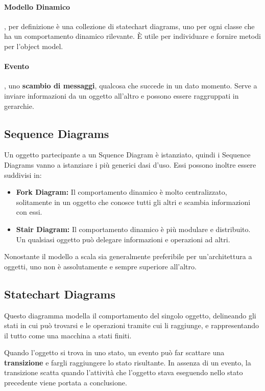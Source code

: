     \paragraph{Modello Dinamico}, per definizione è una collezione di statechart diagrams, uno per ogni classe che ha un comportamento dinamico rilevante. È utile per individuare e fornire metodi per l'object model.
    
    \paragraph{Evento}, uno \textbf{scambio di messaggi}, qualcosa che succede in un dato momento. Serve a inviare informazioni da un oggetto all'altro e possono essere raggruppati in gerarchie.
    
    \subsection{Sequence Diagrams}
        Un oggetto partecipante a un Squence Diagram è istanziato, quindi i Sequence Diagrams vanno a istanziare i più generici dasi d'uso. Essi possono inoltre essere suddivisi in:
        
        \begin{itemize}
            \item \textbf{Fork Diagram:} Il comportamento dinamico è molto centralizzato, solitamente in un oggetto che conosce tutti gli altri e scambia informazioni con essi.
            \item \textbf{Stair Diagram:} Il comportamento dinamico è più modulare e distribuito. Un qualsiasi oggetto può delegare informazioni e operazioni ad altri.
        \end{itemize}
        
        Nonostante il modello a scala sia generalmente preferibile per un'architettura a oggetti, uno non è assolutamente e sempre superiore all'altro.
        
    \subsection{Statechart Diagrams}
        Questo diagramma modella il comportamento del singolo oggetto, delineando gli stati in cui può trovarsi e le operazioni tramite cui li raggiunge, e rappresentando il tutto come una macchina a stati finiti.
        
        Quando l'oggetto si trova in uno stato, un evento può far scattare una \textbf{transizione} e fargli raggiungere lo stato risultante. In assenza di un evento, la transizione scatta quando l'attività che l'oggetto stava eseguendo nello stato precedente viene portata a conclusione.
        
